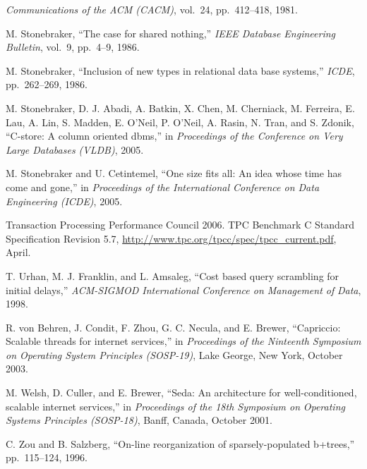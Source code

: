 \documentclass[a4paper,11pt,twoside,openright]{book}
\begin{document}
\begin{enumerate}[label={[\arabic*]}]
  \emph{Communications of the ACM (CACM)}, vol.~24, pp.~412--418, 1981.
\item
  M. Stonebraker, ``The case for shared nothing,'' \emph{IEEE Database
  Engineering} \emph{Bulletin}, vol.~9, pp.~4--9, 1986.
\item
  M. Stonebraker, ``Inclusion of new types in relational data base
  systems,'' \emph{ICDE}, pp.~262--269, 1986.
\item
  M. Stonebraker, D. J. Abadi, A. Batkin, X. Chen, M. Cherniack, M.
  Ferreira, E. Lau, A. Lin, S. Madden, E. O'Neil, P. O'Neil, A. Rasin,
  N. Tran, and S. Zdonik, ``C-store: A column oriented dbms,'' in \emph{Proceedings
of the Conference on Very Large Databases (VLDB)}, 2005.
\item
  M. Stonebraker and U. Cetintemel, ``One size fits all: An idea whose
  time has come and gone,'' in \emph{Proceedings of the International
  Conference on Data} \emph{Engineering (ICDE)}, 2005.
\item
  Transaction Processing Performance Council 2006. TPC Benchmark C
  Standard Specification Revision 5.7, \url{http://www.tpc.org/tpcc/spec/tpcc\_current.pdf}, April.
\item
  T. Urhan, M. J. Franklin, and L. Amsaleg, ``Cost based query
  scrambling for initial delays,'' \emph{ACM-SIGMOD International
  Conference on Management of} \emph{Data}, 1998.
\item
  R. von Behren, J. Condit, F. Zhou, G. C. Necula, and E. Brewer,
  ``Capriccio: Scalable threads for internet services,'' in
  \emph{Proceedings of the Ninteenth Symposium on Operating System
  Principles (SOSP-19)}, Lake George, New York, October 2003.
\item
  M. Welsh, D. Culler, and E. Brewer, ``Seda: An architecture for well-conditioned,
  scalable internet services,'' in \emph{Proceedings of the
  18th Symposium on} \emph{Operating Systems Principles (SOSP-18)},
  Banff, Canada, October 2001.
\item
  C. Zou and B. Salzberg, ``On-line reorganization of sparsely-populated
  b+trees,'' pp.~115--124, 1996.
\end{enumerate}
\end{document}
